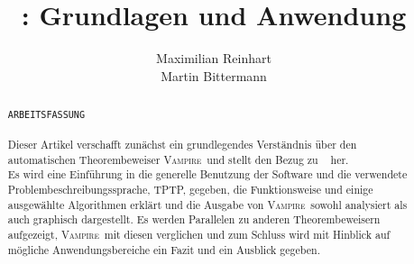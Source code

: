 \documentclass{article}
\author{
	Maximilian Reinhart\\
	Martin Bittermann
}
\title{\vampire: Grundlagen und Anwendung}
\newcommand{\vampire}{\textsc{Vampire}~}
\begin{document}
\maketitle

\begin{abstract}
	\texttt{ARBEITSFASSUNG}\\
	\\
	Dieser Artikel verschafft zunächst ein grundlegendes Verständnis über den automatischen Theorembeweiser \vampire und
	stellt den Bezug zu ~\cite{cav2013} her. \\
	Es wird eine Einführung in die generelle Benutzung der Software und die verwendete Problembeschreibungssprache, TPTP, gegeben, 
	die Funktionsweise und einige ausgewählte Algorithmen erklärt und
	die Ausgabe von \vampire sowohl analysiert als auch graphisch dargestellt.
	Es werden Parallelen zu anderen Theorembeweisern aufgezeigt, \vampire mit diesen verglichen 
	und zum Schluss wird mit Hinblick auf mögliche Anwendungsbereiche ein Fazit und ein Ausblick gegeben.
\end{abstract}


\end{document}
